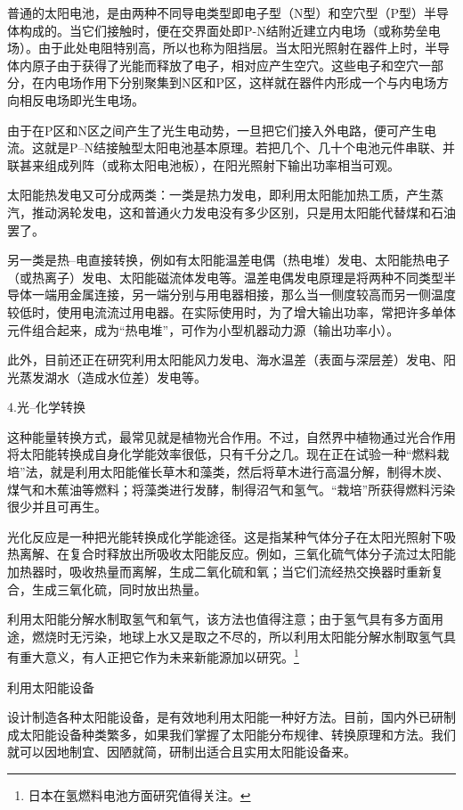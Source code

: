 \documentclass{ctexbook}
\begin{document}
普通的太阳电池，是由两种不同导电类型即电子型（N型）和空穴型（P型）半导体构成的。当它们接触时，便在交界面处即P-N结附近建立内电场（或称势垒电场）。由于此处电阻特别高，所以也称为阻挡层。当太阳光照射在器件上时，半导体内原子由于获得了光能而释放了电子，相对应产生空穴。这些电子和空穴一部分，在内电场作用下分别聚集到N区和P区，这样就在器件内形成一个与内电场方向相反电场即光生电场。

由于在P区和N区之间产生了光生电动势，一旦把它们接入外电路，便可产生电流。这就是P--N结接触型太阳电池基本原理。若把几个、几十个电池元件串联、并联甚来组成列阵（或称太阳电池板），在阳光照射下输出功率相当可观。

太阳能热发电又可分成两类：一类是热力发电，即利用太阳能加热工质，产生蒸汽，推动涡轮发电，这和普通火力发电没有多少区别，只是用太阳能代替煤和石油罢了。

另一类是热--电直接转换，例如有太阳能温差电偶（热电堆）发电、太阳能热电子（或热离子）发电、太阳能磁流体发电等。温差电偶发电原理是将两种不同类型半导体一端用金属连接，另一端分别与用电器相接，那么当一侧度较高而另一侧温度较低时，使用电流流过用电器。在实际使用时，为了增大输出功率，常把许多单体元件组合起来，成为“热电堆”，可作为小型机器动力源（输出功率小）。


此外，目前还正在研究利用太阳能风力发电、海水温差（表面与深层差）发电、阳光蒸发湖水（造成水位差）发电等。

4.光--化学转换

这种能量转换方式，最常见就是植物光合作用。不过，自然界中植物通过光合作用将太阳能转换成自身化学能效率很低，只有千分之几。现在正在试验一种“燃料栽培”法，就是利用太阳能催长草木和藻类，然后将草木进行高温分解，制得木炭、煤气和木蕉油等燃料；将藻类进行发酵，制得沼气和氢气。“栽培”所获得燃料污染很少并且可再生。

光化反应是一种把光能转换成化学能途径。这是指某种气体分子在太阳光照射下吸热离解、在复合时释放出所吸收太阳能反应。例如，三氧化硫气体分子流过太阳能加热器时，吸收热量而离解，生成二氧化硫和氧；当它们流经热交换器时重新复合，生成三氧化硫，同时放出热量。

利用太阳能分解水制取氢气和氧气，该方法也值得注意；由于氢气具有多方面用途，燃烧时无污染，地球上水又是取之不尽的，所以利用太阳能分解水制取氢气具有重大意义，有人正把它作为未来新能源加以研究。\footnote{日本在氢燃料电池方面研究值得关注。}

利用太阳能设备

设计制造各种太阳能设备，是有效地利用太阳能一种好方法。目前，国内外已研制成太阳能设备种类繁多，如果我们掌握了太阳能分布规律、转换原理和方法。我们就可以因地制宜、因陋就简，研制出适合且实用太阳能设备来。
\end{document}

